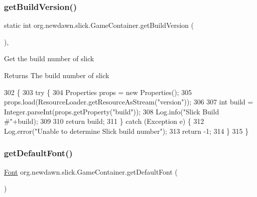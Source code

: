 \subsubsection{\texorpdfstring{get\+Build\+Version()}{getBuildVersion()}}
{\footnotesize\ttfamily static int org.\+newdawn.\+slick.\+Game\+Container.\+get\+Build\+Version (\begin{DoxyParamCaption}{ }\end{DoxyParamCaption})\hspace{0.3cm}{\ttfamily [inline]}, {\ttfamily [static]}}

Get the build number of slick

\begin{DoxyReturn}{Returns}
The build number of slick 
\end{DoxyReturn}

\begin{DoxyCode}
302                                         \{
303         \textcolor{keywordflow}{try} \{
304             Properties props = \textcolor{keyword}{new} Properties();
305             props.load(ResourceLoader.getResourceAsStream(\textcolor{stringliteral}{"version"}));
306             
307             \textcolor{keywordtype}{int} build = Integer.parseInt(props.getProperty(\textcolor{stringliteral}{"build"}));
308             Log.info(\textcolor{stringliteral}{"Slick Build #"}+build);
309             
310             \textcolor{keywordflow}{return} build;
311         \} \textcolor{keywordflow}{catch} (Exception e) \{
312             Log.error(\textcolor{stringliteral}{"Unable to determine Slick build number"});
313             \textcolor{keywordflow}{return} -1;
314         \}
315     \}
\end{DoxyCode}
\mbox{\label{classorg_1_1newdawn_1_1slick_1_1_game_container_ab1e394eedde686708f3083869b45cf5d}} 
\subsubsection{\texorpdfstring{get\+Default\+Font()}{getDefaultFont()}}
{\footnotesize\ttfamily \mbox{\hyperlink{interfaceorg_1_1newdawn_1_1slick_1_1_font}{Font}} org.\+newdawn.\+slick.\+Game\+Container.\+get\+Default\+Font (\begin{DoxyParamCaption}{ }\end{DoxyParamCaption})\hspace{0.3cm}{\ttfamily [inline]}}


